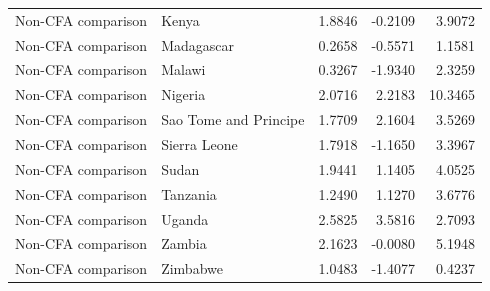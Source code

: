 \begin{table}
\begin{tabular}[t]{llrrr}
Non-CFA comparison & Kenya & 1.8846 & -0.2109 & 3.9072\\
\addlinespace
Non-CFA comparison & Madagascar & 0.2658 & -0.5571 & 1.1581\\
Non-CFA comparison & Malawi & 0.3267 & -1.9340 & 2.3259\\
Non-CFA comparison & Nigeria & 2.0716 & 2.2183 & 10.3465\\
Non-CFA comparison & Sao Tome and Principe & 1.7709 & 2.1604 & 3.5269\\
Non-CFA comparison & Sierra Leone & 1.7918 & -1.1650 & 3.3967\\
\addlinespace
Non-CFA comparison & Sudan & 1.9441 & 1.1405 & 4.0525\\
Non-CFA comparison & Tanzania & 1.2490 & 1.1270 & 3.6776\\
Non-CFA comparison & Uganda & 2.5825 & 3.5816 & 2.7093\\
Non-CFA comparison & Zambia & 2.1623 & -0.0080 & 5.1948\\
Non-CFA comparison & Zimbabwe & 1.0483 & -1.4077 & 0.4237\\
\bottomrule
\end{tabular}
\end{table}